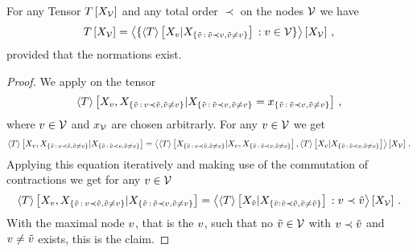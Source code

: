 \begin{theorem}
    \label{the:genericChainRule}
    For any Tensor $T\left[X_{\mathcal{V}}\right]$ and any total order $\prec$ on the nodes $\mathcal{V}$ we have %
    \begin{align*}
        T\left[X_{\mathcal{V}}\right] =
        \left\langle 
            \{\left\langle T\right\rangle \left[ X_{v} | X_{\{\tilde{v} \, : \, \tilde{v} \prec v, \tilde{v}\neq v\}} \right]  \, : v\in\mathcal{V} \}
        \right\rangle \left[ X_{\mathcal{V}} \right] \, ,
    \end{align*}
    provided that the normations exist.
\end{theorem}
\begin{proof}
    We apply  on the tensor
    \begin{align*}
        \left\langle T\right\rangle \left[ 
            X_{v},X_{\{\tilde{v} \, : \, v \prec \tilde{v}, \tilde{v}\neq v\}}
         | 
            X_{\{\tilde{v} \, : \, \tilde{v} \prec v, \tilde{v}\neq v\}}=x_{\{\tilde{v} \, : \, \tilde{v} \prec v, \tilde{v}\neq v\}}
         \right] \, ,
    \end{align*}
    where $v\in\mathcal{V}$ and $x_{\mathcal{V}}$ are chosen arbitrarly.
    For any $v\in\mathcal{V}$ we get
    \begin{align*}
        \left\langle T\right\rangle \left[ 
            X_{v},X_{\{\tilde{v} \, : \, v \prec \tilde{v}, \tilde{v}\neq v\}}
         | 
            X_{\{\tilde{v} \, : \, \tilde{v} \prec v, \tilde{v}\neq v\}}
         \right]
        = \left\langle 
            \left\langle T\right\rangle \left[ 
                X_{\{\tilde{v} \, : \, v \prec \tilde{v}, \tilde{v}\neq v\}}
             | 
                X_{v},X_{\{\tilde{v} \, : \, \tilde{v} \prec v, \tilde{v}\neq v\}}
             \right],
            \left\langle T\right\rangle \left[ 
                X_{v}
             | 
                X_{\{\tilde{v} \, : \, \tilde{v} \prec v, \tilde{v}\neq v\}}
             \right]
        \right\rangle \left[ 
            X_{\mathcal{V}}
         \right] \, .
    \end{align*}
    Applying this equation iteratively and making use of the commutation of contractions we get for any $v\in\mathcal{V}$
    \begin{align*}
        \left\langle T\right\rangle \left[ 
            X_{v},X_{\{\tilde{v} \, : \, v \prec \tilde{v}, \tilde{v}\neq v\}}
         | 
            X_{\{\tilde{v} \, : \, \tilde{v} \prec v, \tilde{v}\neq v\}}
         \right]
        = \left\langle 
            \left\langle T\right\rangle \left[ 
                X_{\tilde{v}}
             | 
                X_{\{\bar{v} : \bar{v} \prec \tilde{v}, \bar{v}\neq\tilde{v}\}}
             \right]
            \, : v \prec \tilde{v}
        \right\rangle \left[ 
            X_{\mathcal{V}}
         \right] \, .
    \end{align*}
    With the maximal node $v$, that is the $v$, such that no $\tilde{v}\in\mathcal{V}$ with $v\prec\tilde{v}$ and $v\neq\tilde{v}$ exists, this is the claim.
\end{proof}


